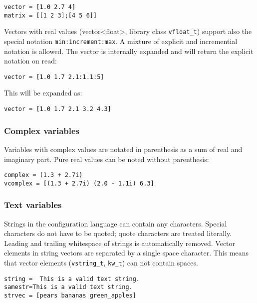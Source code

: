 \begin{verbatim}
vector = [1.0 2.7 4]
matrix = [[1 2 3];[4 5 6]]
\end{verbatim}

Vectors with real values (vector<float>, library class
\verb!vfloat_t!) support also the special notation
\verb!min:increment:max!. A mixture of explicit and incremential
notation is allowed. The vector is internally expanded and will return
the explicit notation on read:

\begin{verbatim}
vector = [1.0 1.7 2.1:1.1:5]
\end{verbatim}

This will be expanded as:

\begin{verbatim}
vector = [1.0 1.7 2.1 3.2 4.3]
\end{verbatim}

\subsubsection{Complex variables}%
%
%

Variables with complex values are notated in parenthesis as a sum of
real and imaginary part. Pure real values can be noted without
parenthesis:

\begin{verbatim}
complex = (1.3 + 2.7i)
vcomplex = [(1.3 + 2.7i) (2.0 - 1.1i) 6.3]
\end{verbatim}

\subsubsection{Text variables}

Strings in the \mha{} configuration language can contain any characters. Special
characters do not have to be quoted; quote characters are treated
literally. Leading and trailing whitespace of strings is automatically
removed. Vector elements in string vectors are separated by a single
space character. This means that vector elements
(\verb!vstring_t!, \verb!kw_t!) can not contain spaces.

\begin{verbatim}
string =  This is a valid text string.
samestr=This is a valid text string.
strvec = [pears bananas green_apples]
\end{verbatim}

